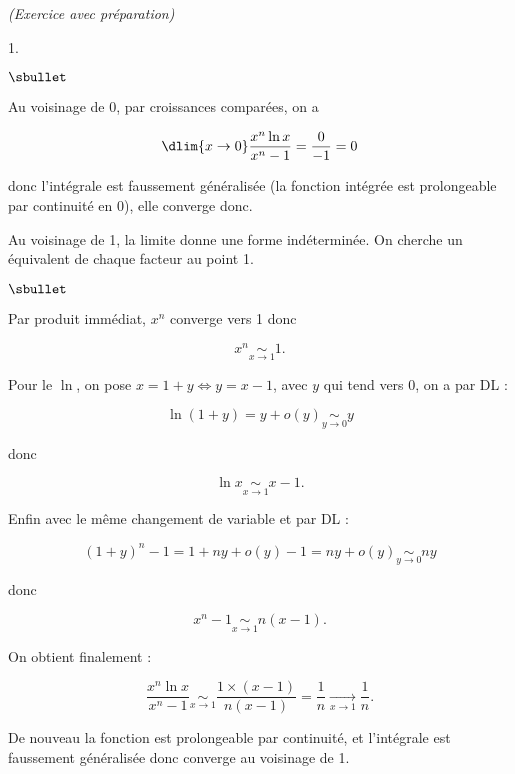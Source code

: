 \documentclass[11pt]{article}%
\begin{document}
\begin{exercice}{\it (Exercice avec préparation)}
\begin{noliste}{1.}
\begin{noliste}{$\sbullet$}
 \item Au voisinage de 0, par croissances comparées, on a 
 
\[
 \dlim{ x \rightarrow 0 } \frac{ x^{n} \ln x }{ x^{n} - 1 } = \frac{ 0
}{ -1 } = 0 
\]

 donc l'intégrale est faussement généralisée (la fonction intégrée est
prolongeable par continuité en 0), elle converge donc. \\

 \item Au voisinage de 1, la limite donne une forme indéterminée. On
cherche un équivalent de chaque facteur au point 1.
\begin{noliste}{$\sbullet$}

 \item Par produit immédiat, $x^{n}$ converge vers 1 donc 
 
\[
 x^{n} \underset{ x \rightarrow 1 }{ \sim } 1. 
\]

 \item Pour le $\ln$, on pose $ x = 1 + y \Longleftrightarrow y = x -
1$, avec $y$ qui tend vers 0, on a par DL : 
 
\[
 \ln (1 + y ) = y + o (y) \underset{ y \rightarrow 0 }{ \sim } y 
\]

 donc
 
\[
 \ln x \underset{ x \rightarrow 1 }{ \sim } x - 1. 
\]

 \item Enfin avec le même changement de variable et par DL : 
 
\[
 (1 + y)^{n} - 1 = 1 + n y + o(y) - 1 = n y + o(y) \underset{ y
\rightarrow 0 }{ \sim } n y 
\]

 donc
 
\[
 x^{n} - 1 \underset{ x \rightarrow 1 }{ \sim } n (x-1 ). 
\]

 \end{noliste}

 On obtient finalement : 
 
\[
 \frac{ x^{n} \ln x }{ x^{n} - 1 } \underset{ x \rightarrow 1 }{ \sim }
\frac{ 1 \times (x-1 ) }{ n (x-1 ) } = \frac{ 1 }{ n } \xrightarrow[ x
\rightarrow 1 ]{} \frac{1}{n}. 
\]


 De nouveau la fonction est prolongeable par continuité, et l'intégrale
est faussement généralisée donc converge au voisinage de 1. \\

 \end{noliste}


\end{noliste}
\end{exercice}
\end{document}
